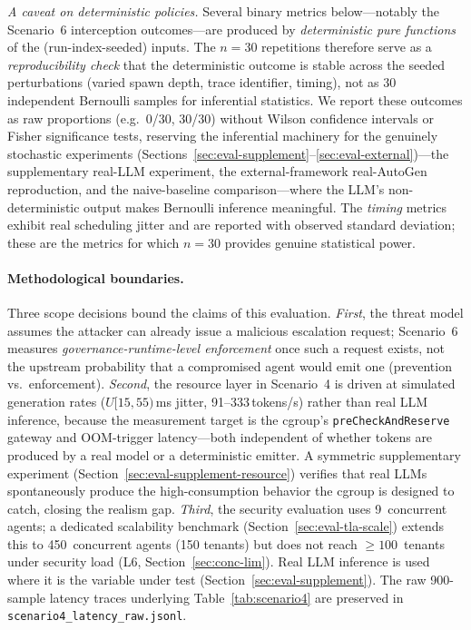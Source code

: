 \emph{A caveat on deterministic policies.} Several binary metrics
below---notably the Scenario~6 interception outcomes---are produced by
\emph{deterministic pure functions} of the (run-index-seeded) inputs.
The $n=30$ repetitions therefore serve as a \emph{reproducibility
check} that the deterministic outcome is stable across the seeded
perturbations (varied spawn depth, trace identifier, timing), not as
$30$ independent Bernoulli samples for inferential statistics. We
report these outcomes as raw proportions (e.g.\ 0/30, 30/30) without
Wilson confidence intervals or Fisher significance tests, reserving
the inferential machinery for the genuinely stochastic experiments
(Sections~\ref{sec:eval-supplement}--\ref{sec:eval-external})---the
supplementary real-LLM experiment, the external-framework real-AutoGen
reproduction, and the naive-baseline comparison---where the LLM's
non-deterministic output makes Bernoulli inference meaningful. The
\emph{timing} metrics exhibit real scheduling jitter and are reported
with observed standard deviation; these are the metrics for which
$n=30$ provides genuine statistical power.

\paragraph{Methodological boundaries.}
Three scope decisions bound the claims of this evaluation.
\emph{First}, the threat model assumes the attacker can already issue a
malicious escalation request; Scenario~6 measures
\emph{governance-runtime-level enforcement} once such a request exists,
not the upstream probability that a compromised agent would emit one
(prevention vs.\ enforcement). \emph{Second}, the resource layer in
Scenario~4 is driven at simulated generation rates ($U[15,55)$\,ms
jitter, 91--333\,tokens/s) rather than real LLM inference, because the
measurement target is the cgroup's \texttt{preCheckAndReserve} gateway
and OOM-trigger latency---both independent of whether tokens are
produced by a real model or a deterministic emitter. A symmetric
supplementary experiment (Section~\ref{sec:eval-supplement-resource})
verifies that real LLMs spontaneously produce the high-consumption
behavior the cgroup is designed to catch, closing the realism gap.
\emph{Third}, the security evaluation uses 9~concurrent agents; a
dedicated scalability benchmark (Section~\ref{sec:eval-tla-scale}) extends
this to 450~concurrent agents (150 tenants) but does not reach
$\geq 100$~tenants under security load (L6,
Section~\ref{sec:conc-lim}). Real LLM inference is used where it
is the variable under test (Section~\ref{sec:eval-supplement}). The
raw 900-sample latency traces underlying Table~\ref{tab:scenario4} are
preserved in \texttt{scenario4\_latency\_raw.jsonl}.

